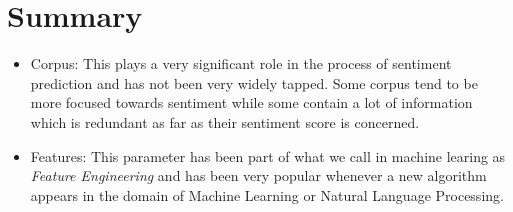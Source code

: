 	\section{Summary}
\begin{itemize}
	\item Corpus: This plays a very significant role in the process of sentiment prediction and has not been very widely tapped. Some corpus tend to be more focused towards sentiment while some contain a lot of information which is redundant as far as their sentiment score is concerned.
	\item Features: This parameter has been part of what we call in machine learing as \emph{Feature Engineering} and has been very popular whenever a new algorithm appears in the domain of Machine Learning or Natural Language Processing.
\end{itemize}
